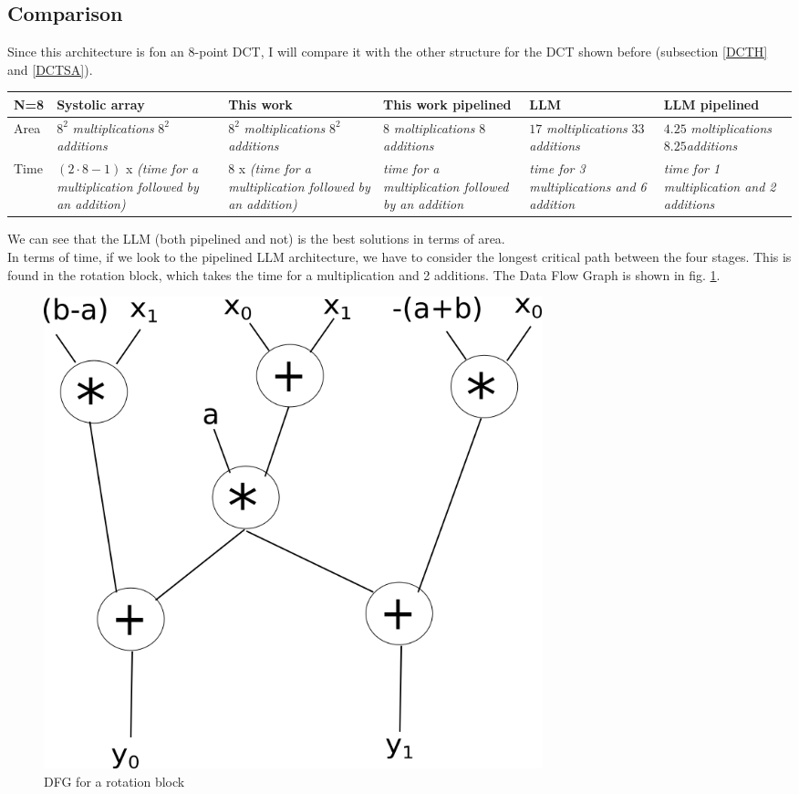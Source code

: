      \subsection{Comparison}
     Since this architecture is fon an 8-point DCT, I will compare it with the other structure for the DCT shown before (subsection \ref{DCTH} and \ref{DCTSA}).
     \begin{center}
     	\begin{tabular}{ | p{1cm} |  p{2.5cm} |  p{2.5cm} | p{2.5cm} | p{2.5cm}|p{2.5cm}|}
     	\hline
     	\label{table:dct8_tab}N=8 & Systolic array & This work & This work pipelined & LLM & LLM pipelined\\
     	\hline
     	Area & $ 8^{2}$ \textit{multiplications} $8^{2}$ \textit{additions}&$8^{2}$ \textit{ moltiplications}  $ 8^{2}$\textit{additions} & $8$ \textit{moltiplications} $8$\textit{additions} & $17$ \textit{moltiplications} $33$\textit{additions} & $4.25
     	$ \textit{moltiplications}  $ 8.25$\textit{additions}\\ 
     	\hline
     	Time &$(2\cdot8-1)$ x \textit{(time for a multiplication followed by an addition)}&
     	$ 8 $ x \textit{(time for a multiplication followed by an addition)}&\textit{time for a multiplication followed by an addition}&\textit{time for 3 multiplications and 6 addition}&\textit{time for 1 multiplication and 2 additions}\\      	
     	\hline     
     		
     	\end{tabular}
     \end{center}
     \bigskip
     We can see that the LLM (both pipelined and not) is the best solutions in terms of area.\\
     In terms of time, if we look to the pipelined LLM architecture, we have to consider the longest critical path between the four stages. This is found in the rotation block, which takes the time for a multiplication and 2 additions. The Data Flow Graph is shown in fig. \ref{rot}.
          \begin{figure}[h!]
          	\centering	
          	\includegraphics[width=0.7\textwidth]{imm/dct/rot.png}  
          	\caption{DFG for a rotation block} 
          	\label{rot}
          \end{figure}
